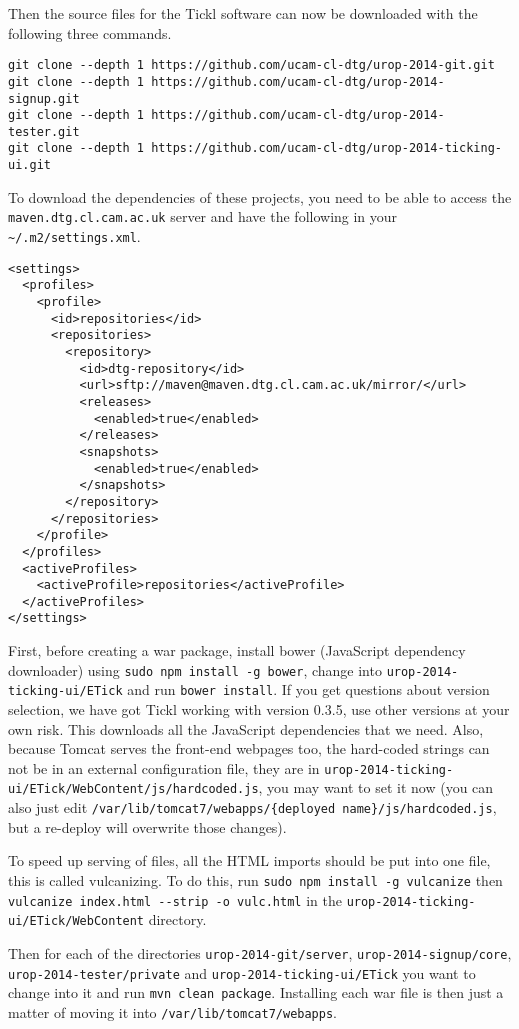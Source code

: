 \documentclass[12pt,a4paper]{article}
\newcommand{\tomcatwd}{{\tt /var/\hspace{0pt}lib/\hspace{0pt}tomcat7}}
\newcommand{\localHardcodedJs}{{\tt urop-2014-ticking-ui/\hspace{0pt}ETick/\hspace{0pt}WebContent/\hspace{0pt}js/\hspace{0pt}hardcoded.js}}
\newcommand{\deployedHardcodedJs}{\tomcatwd{\tt/\hspace{0pt}webapps/\hspace{0pt}\{deployed name\}/\hspace{0pt}js/\hspace{0pt}hardcoded.js}}
\begin{document}
Then the source files for the Tickl software can now be downloaded with the following three commands.
\begin{verbatim}
git clone --depth 1 https://github.com/ucam-cl-dtg/urop-2014-git.git
git clone --depth 1 https://github.com/ucam-cl-dtg/urop-2014-signup.git
git clone --depth 1 https://github.com/ucam-cl-dtg/urop-2014-tester.git
git clone --depth 1 https://github.com/ucam-cl-dtg/urop-2014-ticking-ui.git
\end{verbatim}

To download the dependencies of these projects, you need to be able to access the {\tt maven.dtg.cl.cam.ac.uk} server and have the following in your {\tt \~{}/.m2/settings.xml}.
\begin{verbatim}
<settings>
  <profiles>
    <profile>
      <id>repositories</id>
      <repositories>
        <repository>
          <id>dtg-repository</id>
          <url>sftp://maven@maven.dtg.cl.cam.ac.uk/mirror/</url>
          <releases>
            <enabled>true</enabled>
          </releases>
          <snapshots>
            <enabled>true</enabled>
          </snapshots>
        </repository>
      </repositories>
    </profile>
  </profiles>
  <activeProfiles>
    <activeProfile>repositories</activeProfile>
  </activeProfiles>
</settings>
\end{verbatim}

First, before creating a war package, install bower (JavaScript dependency downloader) using {\tt sudo npm install -g bower}, change into {\tt urop-2014-ticking-ui/ETick} and run {\tt bower install}.
If you get questions about version selection, we have got Tickl working with version 0.3.5, use other versions at your own risk.
This downloads all the JavaScript dependencies that we need.
Also, because Tomcat serves the front-end webpages too, the hard-coded strings can not be in an external configuration file, they are in \localHardcodedJs, you may want to set it now (you can also just edit \deployedHardcodedJs, but a re-deploy will overwrite those changes).

To speed up serving of files, all the HTML imports should be put into one file, this is called vulcanizing.
To do this, run {\tt sudo npm install -g vulcanize} then {\tt vulcanize index.html -{}-strip -o vulc.html} in the {\tt urop-2014-ticking-ui/\hspace{0pt}ETick/\hspace{0pt}WebContent} directory.

Then for each of the directories {\tt urop-2014-git/server}, {\tt urop-2014-signup/core}, {\tt urop-2014-tester/private} and {\tt urop-2014-ticking-ui/ETick} you want to change into it and run {\tt mvn clean package}.
Installing each war file is then just a matter of moving it into \tomcatwd{}{\tt/webapps}.
\end{document}
